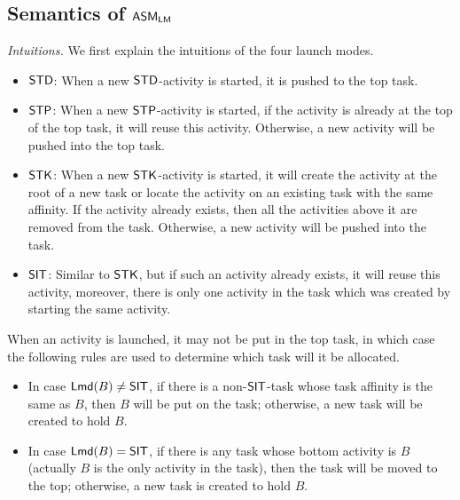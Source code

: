 

\subsection{Semantics of $\textsf{ASM}_\textsf{LM}$} \label{sect:semlmamass}



%
\noindent\emph{Intuitions.}  We first explain the intuitions of the four launch modes. 

\begin{itemize}
	\item  $\mathsf{STD}$: When a new $\mathsf{STD}$-activity is started, it is pushed to the top task. 
	\item $\mathsf{STP}$: When a new $\mathsf{STP}$-activity is started, if the activity is already at the top of the top task, it will reuse this activity. Otherwise, a new activity will be pushed into the top task.
	\item $\mathsf{STK}$: When a new $\mathsf{STK}$-activity is started, it will create the activity at the root of a new task or locate the activity on an existing task with the same affinity. If the activity already exists, then all the activities above it are removed from the task. Otherwise, a new activity will be pushed into the task.
	\item $\mathsf{SIT}$: 
	Similar to $\mathsf{STK}$, but if such an activity already exists, it will reuse this activity, moreover, there is only one activity in the task which was created by starting the same activity.
\end{itemize}




When an activity is launched, it may not be put in the top task, in which case  
the following rules are used to determine which task will it be allocated. 
\begin{itemize}
	\item In case ${\sf Lmd}(B) \neq \mathsf{SIT}$, if there is a non-$\mathsf{SIT}$-task whose task affinity is the same as $B$, then $B$ will be put on the task; otherwise, a new task will be created to hold $B$.
	
	\item In case ${\sf Lmd}(B) = \mathsf{SIT}$,    if there is any task whose bottom activity is $B$ (actually $B$ is the only activity in the task), then the task will be moved to the top; otherwise, a new task is created to hold $B$.
\end{itemize}

